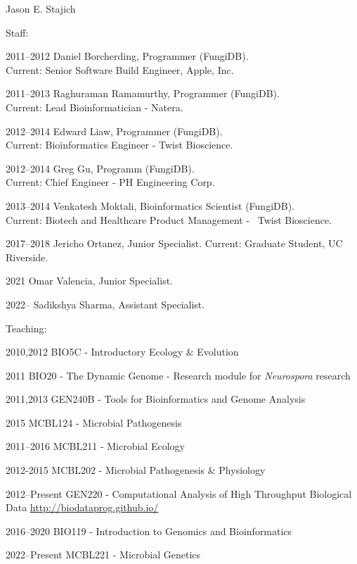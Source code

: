 \documentclass[10pt]{article}
\begin{document}
\begin{cv}{\centerline{Jason E. Stajich}}
\begin{cvlistcompact}{Staff:}
\item [2011--2012] Daniel Borcherding, Programmer (FungiDB). \\ Current: Senior Software Build Engineer, Apple, Inc.
\item [2011--2013] Raghuraman Ramamurthy, Programmer (FungiDB). \\ Current: Lead Bioinformatician - Natera.
\item [2012--2014] Edward Liaw, Programmer (FungiDB). \\ Current: Bioinformatics Engineer - Twist Bioscience.
\item [2012--2014] Greg Gu, Programm (FungiDB). \\ Current: Chief Engineer - PH Engineering Corp.
\item [2013--2014] Venkatesh Moktali, Bioinformatics Scientist (FungiDB). \\ Current: Biotech and Healthcare Product Management -  Twist Bioscience.
\item [2017--2018] Jericho Ortanez, Junior Specialist. Current: Graduate Student, UC Riverside.
\item [2021] Omar Valencia, Junior Specialist.
\item [2022--] Sadikshya Sharma, Assistant Specialist.
\end{cvlistcompact}

\begin{cvlistcompact}{Teaching:}
\item [2010,2012] BIO5C - Introductory Ecology \& Evolution
\item [2011] BIO20 - The Dynamic Genome - Research module for \textit{Neurospora} research
\item [2011,2013] GEN240B - Tools for Bioinformatics and Genome Analysis
\item [2015] MCBL124 - Microbial Pathogenesis
\item [2011--2016] MCBL211 - Microbial Ecology
\item [2012-2015] MCBL202 - Microbial Pathogenesis \& Physiology
\item [2012--Present] GEN220 - Computational Analysis of High Throughput Biological Data \url{http://biodataprog.github.io/}
\item [2016--2020] BIO119 - Introduction to Genomics and Bioinformatics
\item [2022--Present] MCBL221 - Microbial Genetics


\end{cvlistcompact}
\end{cv}
\end{document}
